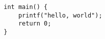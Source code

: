 \documentclass{article}
\begin{document}
	\begin{verbatim}
		int main() {
			printf("hello, world");
			return 0;
		}
	\end{verbatim}
\end{document}
